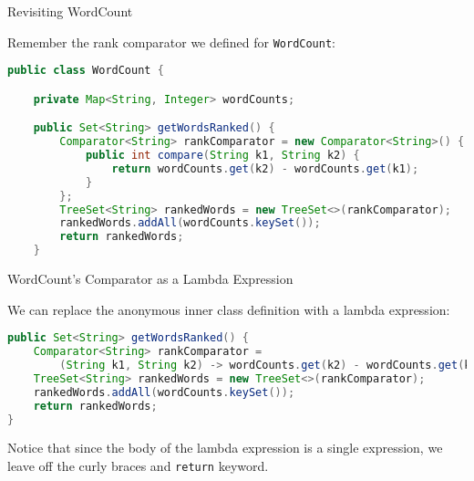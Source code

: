 \documentclass{beamer}
\begin{document}
\begin{frame}[fragile]{Revisiting WordCount}

Remember the rank comparator we defined for {\tt WordCount}:
\begin{lstlisting}[language=Java]
public class WordCount {

    private Map<String, Integer> wordCounts;

    public Set<String> getWordsRanked() {
        Comparator<String> rankComparator = new Comparator<String>() {
            public int compare(String k1, String k2) {
                return wordCounts.get(k2) - wordCounts.get(k1);
            }
        };
        TreeSet<String> rankedWords = new TreeSet<>(rankComparator);
        rankedWords.addAll(wordCounts.keySet());
        return rankedWords;
    }
\end{lstlisting}


\end{frame}

\begin{frame}[fragile]{WordCount's Comparator as a Lambda Expression}

We can replace the anonymous inner class definition with a lambda expression:

\begin{lstlisting}[language=Java]
public Set<String> getWordsRanked() {
    Comparator<String> rankComparator =
        (String k1, String k2) -> wordCounts.get(k2) - wordCounts.get(k1);
    TreeSet<String> rankedWords = new TreeSet<>(rankComparator);
    rankedWords.addAll(wordCounts.keySet());
    return rankedWords;
}
\end{lstlisting}

Notice that since the body of the lambda expression is a single expression, we leave off the curly braces and {\tt return} keyword.

\end{frame}
\end{document}
